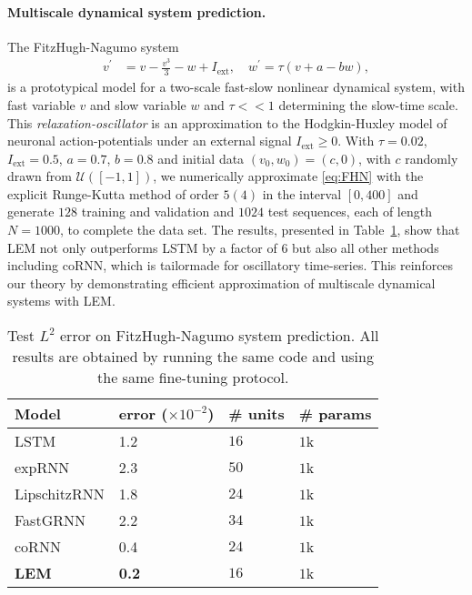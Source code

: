 \documentclass{article} \usepackage{iclr2022_conference,times}
\newcommand{\Tref}[1]{Table~\ref{#1}}
\begin{document}
\paragraph{Multiscale dynamical system prediction.}
The FitzHugh-Nagumo system \citep{Fitznag} \begin{equation}
\label{eq:FHN}
\begin{aligned}
    v^\prime &= v - \frac{v^3}{3} -w + I_{\text{ext}}, \quad 
    w^\prime = \tau(v + a - bw),
\end{aligned}
\end{equation}
is a prototypical model for a two-scale fast-slow nonlinear dynamical system, with fast variable $v$ and slow variable $w$ and $\tau << 1$ determining the slow-time scale. This \emph{relaxation-oscillator} is an approximation to the Hodgkin-Huxley model \citep{HH} of neuronal action-potentials under an external signal $I_{\text{ext}}\geq0$. With $\tau=0.02$, $I_{\text{ext}}=0.5$, $a=0.7$, $b=0.8$ and initial data $(v_0,w_0) = (c,0)$, with $c$ randomly drawn from $\mathcal{U}([-1,1])$, we numerically approximate \eqref{eq:FHN} with the explicit Runge-Kutta method of order $5(4)$ in the interval $[0,400]$ and generate $128$ training and validation and $1024$ test sequences, each of length $N=1000$, to complete the data set. The results, presented in \Tref{tab:FHN}, show that LEM not only outperforms LSTM by a factor of $6$ but also all other methods including coRNN, which is tailormade for oscillatory time-series. This reinforces our theory by demonstrating efficient approximation of multiscale dynamical systems with LEM.     
\begin{table}[t!]
  \caption{Test $L^2$ error on FitzHugh-Nagumo system prediction. All results are obtained by running the same code and using the same fine-tuning protocol.}
  \label{tab:FHN}
  \centering
  \begin{tabular}{llll}
    \toprule
    \cmidrule(r){1-4}
    Model &  error ($\times 10^{-2}$) & \# units & \# params \\
    \midrule
LSTM  & 1.2 & $16$ & $1$k\\
expRNN  & 2.3 & $50$ & $1$k  \\
LipschitzRNN  & 1.8 & $24$ & $1$k   \\
FastGRNN  & 2.2 & $34$ & $1$k \\
coRNN  & 0.4 & $24$ & $1$k \\
\textbf{LEM}  & {\bf 0.2} & $16$ & $1$k \\
\bottomrule
\end{tabular}
\end{table}
\end{document}
